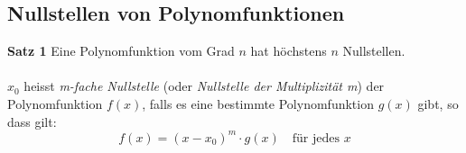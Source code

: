 	\subsection{Nullstellen von Polynomfunktionen}
	\begin{minipage}{1\linewidth}
		\textbf{Satz 1} Eine Polynomfunktion vom Grad $n$ hat höchstens $n$ Nullstellen. \\
		\\
		$x_0$ heisst \textit{m-fache Nullstelle} (oder \textit{Nullstelle der Multiplizität m}) der
		Polynomfunktion $f(x)$, falls es eine bestimmte Polynomfunktion $g(x)$ gibt, so dass gilt:
	\begin{equation*}
		f(x) = (x - x_0)^m \cdot g(x) \quad \text{für jedes } x
	\end{equation*}
	\end{minipage}
\hfill